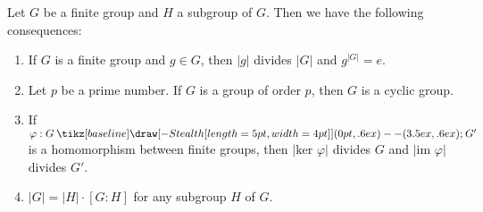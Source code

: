 \documentclass[12pt,letterpaper]{algebra_book}
\renewcommand{\to}{\mathbin{\tikz[baseline] \draw[-{Stealth[length=5pt,width=4pt]}] (0pt,.6ex) -- (3.5ex,.6ex);}}
\renewcommand{\phi}{\varphi}
\theoremstyle{definition}
\begin{document}
    \begin{corollary}
        Let $G$ be a finite group and $H$ a subgroup of $G$. Then we
        have the following consequences: 
        \begin{enumerate}
            \item If $G$ is a finite group and $g \in G$, then $|g|$
            divides $|G|$ and $g^{|G|} = e$.

            \item Let $p$ be a prime number. 
            If $G$ is a group of order $p$, then $G$ is a cyclic
            group.
            
            \item If $ \phi :G \to G'$ is a homomorphism between finite
            groups, then $|\mbox{ker } \phi|$ divides $G$ and
            $|\mbox{im }\phi|$ divides $G'$.

            \item $|G| = |H|\cdot[G:H]$ for any subgroup $H$ of $G$.
        \end{enumerate}
    \end{corollary}
\end{document}
